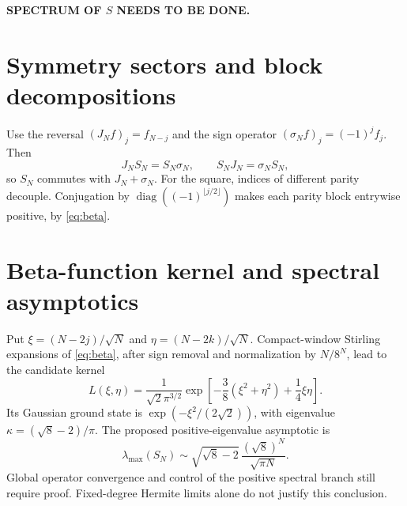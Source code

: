 \noindent\textbf{SPECTRUM OF $S$ NEEDS TO BE DONE.}


\section{Symmetry sectors and block decompositions}
\label{sec:16-4}
Use the reversal $(J_Nf)_j=f_{N-j}$ and the sign operator $(\sigma_Nf)_j=(-1)^jf_j$. Then
\[
J_NS_N=S_N\sigma_N,\qquad S_NJ_N=\sigma_NS_N,
\]
so $S_N$ commutes with $J_N+\sigma_N$. For the square, indices of different parity decouple. Conjugation by $\operatorname{diag}((-1)^{\lfloor j/2\rfloor})$ makes each parity block entrywise positive, by \eqref{eq:beta}.

\section{Beta-function kernel and spectral asymptotics}
\label{sec:16-5}
\begin{remark}
Put $\xi=(N-2j)/\sqrt N$ and $\eta=(N-2k)/\sqrt N$. Compact-window Stirling expansions of \eqref{eq:beta}, after sign removal and normalization by $N/8^N$, lead to the candidate kernel
\[
L(\xi,\eta)=\frac{1}{\sqrt2\pi^{3/2}}
\exp\left[-\frac38(\xi^2+\eta^2)+\frac14\xi\eta\right].
\]
Its Gaussian ground state is $\exp(-\xi^2/(2\sqrt2))$, with eigenvalue $\kappa=(\sqrt8-2)/\pi$. The proposed positive-eigenvalue asymptotic is
\[
\lambda_{\max}(S_N)\sim\sqrt{\sqrt8-2}\,
\frac{(\sqrt8)^N}{\sqrt{\pi N}}.
\]
Global operator convergence and control of the positive spectral branch still require proof. Fixed-degree Hermite limits alone do not justify this conclusion.
\end{remark}

